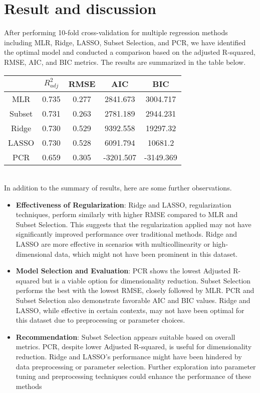 \documentclass[12pt,doublespace]{article}
\begin{document}
	\section{Result and discussion}
	After performing 10-fold cross-validation for multiple regression methods including MLR, Ridge, LASSO, Subset Selection, and PCR, we have identified the optimal model and conducted a comparison based on the adjusted R-squared, RMSE, AIC, and BIC metrics. The results are summarized in the table below.
	\\
	\begin{center}
		\begin{tabular}{|c|c|c|c|c|}
		\hline
		  & $R^{2}_{adj}$ & RMSE & AIC & BIC \\
		\hline
		MLR & 0.735 & 0.277 & 2841.673 & 3004.717 \\
		\hline
		Subset & 0.731 & 0.263 & 2781.189 & 2944.231 \\
		\hline
		Ridge & 0.730 & 0.529 & 9392.558 & 19297.32 \\
		\hline
		LASSO & 0.730 & 0.528 & 6091.794 & 10681.2 \\
		\hline
		PCR & 0.659 & 0.305 & -3201.507 & -3149.369 \\
		\hline
	\end{tabular}
\end{center}
	\\
	In addition to the summary of results, here are some further observations. 
	\begin{itemize}
		\item \textbf{Effectiveness of Regularization}: Ridge and LASSO, regularization techniques, perform similarly with higher RMSE compared to MLR and Subset Selection. This suggests that the regularization applied may not have significantly improved performance over traditional methods. Ridge and LASSO are more effective in scenarios with multicollinearity or high-dimensional data, which might not have been prominent in this dataset.
		
		\item \textbf{Model Selection and Evaluation}: PCR shows the lowest Adjusted R-squared but is a viable option for dimensionality reduction. Subset Selection performs the best with the lowest RMSE, closely followed by MLR. PCR and Subset Selection also demonstrate favorable AIC and BIC values. Ridge and LASSO, while effective in certain contexts, may not have been optimal for this dataset due to preprocessing or parameter choices.
		
		\item \textbf{Recommendation}: Subset Selection appears suitable based on overall metrics. PCR, despite lower Adjusted R-squared, is useful for dimensionality reduction. Ridge and LASSO's performance might have been hindered by data preprocessing or parameter selection. Further exploration into parameter tuning and preprocessing techniques could enhance the performance of these methods
	\end{itemize}
	
\end{document}
